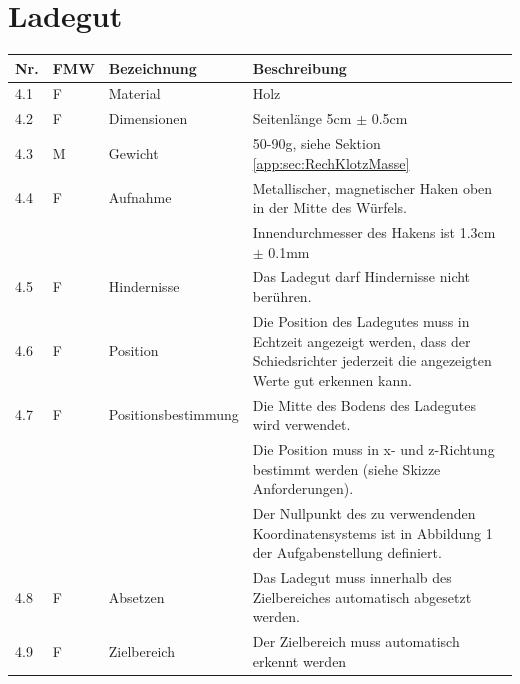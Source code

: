 \documentclass[a4paper]{report}
\begin{document}
\section{Ladegut}
\label{app:sec:AnfLadegut}
\begin{tabular}{|p{}|p{}|p{}|p{}|}
	\hline
	\textbf{Nr.} & \textbf{FMW\footnotemark} & \textbf{Bezeichnung} & \textbf{Beschreibung} \\
	\hline
	4.1 & F & Material & Holz \\
	\hline
	4.2 & F &  Dimensionen & Seitenlänge 5cm $\pm$ 0.5cm \\
	\hline
	4.3 & M & Gewicht & 50-90g, siehe Sektion \ref{app:sec:RechKlotzMasse} \\
	\hline
	4.4 & F & Aufnahme & Metallischer, magnetischer Haken oben in der Mitte des Würfels.\\
	& & & Innendurchmesser des Hakens ist 1.3cm $\pm$ 0.1mm\\
	\hline
	4.5 & F & Hindernisse & Das Ladegut darf Hindernisse nicht berühren. \\
	\hline
	4.6 & F & Position & Die Position des Ladegutes muss in Echtzeit angezeigt werden, dass der Schiedsrichter jederzeit die angezeigten Werte gut erkennen kann.\\
	\hline
	4.7 & F & Positionsbestimmung & Die Mitte des Bodens des Ladegutes wird verwendet.\\
	& & & Die Position muss in x- und z-Richtung bestimmt werden (siehe Skizze Anforderungen).\\
	& & & Der Nullpunkt des zu verwendenden Koordinatensystems ist in Abbildung 1 der Aufgabenstellung definiert. \\
	\hline
	4.8 & F & Absetzen & Das Ladegut muss innerhalb des Zielbereiches automatisch abgesetzt werden. \\
	\hline
	4.9 & F & Zielbereich & Der Zielbereich muss automatisch erkennt werden\\
	\hline
\end{tabular}
\end{document}
